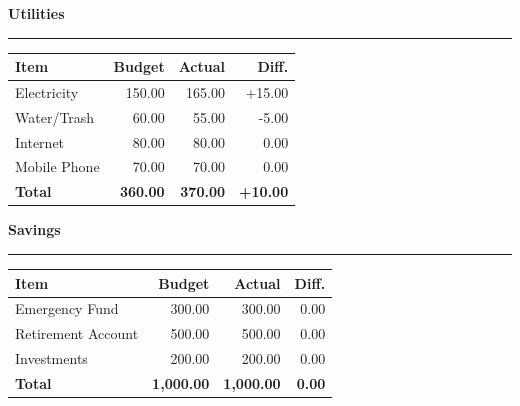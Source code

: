 \documentclass[11pt]{article}
\begin{document}
\begin{minipage}[t]{0.48\textwidth}

  {\large\textbf{\color{accent}Utilities}} \par
  \vspace{0.2em}
  {\color{accent!30}\rule{\linewidth}{1.2pt}} \par
  \vspace{0.4em}
  \begin{tabularx}{\linewidth}{X r r r}
    \textbf{Item} & \textbf{Budget} & \textbf{Actual} & \textbf{Diff.} \\
    \midrule
    Electricity & 150.00 & 165.00 & +15.00 \\
    Water/Trash & 60.00 & 55.00 & -5.00 \\
    Internet & 80.00 & 80.00 & 0.00 \\
    Mobile Phone & 70.00 & 70.00 & 0.00 \\
    \midrule
    \textbf{Total} & \textbf{360.00} & \textbf{370.00} & \textbf{+10.00} \\
  \end{tabularx}

  \vspace{1.5em}

  {\large\textbf{\color{accent}Savings}} \par
  \vspace{0.2em}
  {\color{accent!30}\rule{\linewidth}{1.2pt}} \par
  \vspace{0.4em}
  \begin{tabularx}{\linewidth}{X r r r}
    \textbf{Item} & \textbf{Budget} & \textbf{Actual} & \textbf{Diff.} \\
    \midrule
    Emergency Fund & 300.00 & 300.00 & 0.00 \\
    Retirement Account & 500.00 & 500.00 & 0.00 \\
    Investments & 200.00 & 200.00 & 0.00 \\
    \midrule
    \textbf{Total} & \textbf{1,000.00} & \textbf{1,000.00} & \textbf{0.00} \\
  \end{tabularx}

  \vspace{1.5em}


\end{minipage}
\end{document}
